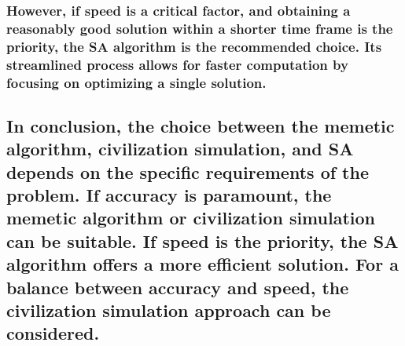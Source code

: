 \documentclass[11pt]{article}
\begin{document}
\hypertarget{however-if-speed-is-a-critical-factor-and-obtaining-a-reasonably-good-solution-within-a-shorter-time-frame-is-the-priority-the-sa-algorithm-is-the-recommended-choice.-its-streamlined-process-allows-for-faster-computation-by-focusing-on-optimizing-a-single-solution.}{%
\subsubsection{\texorpdfstring{ However, if speed is a critical factor,
and obtaining a reasonably good solution within a shorter time frame is
the priority, the SA algorithm is the recommended choice. Its
streamlined process allows for faster computation by focusing on
optimizing a single
solution.}{ However, if speed is a critical factor, and obtaining a reasonably good solution within a shorter time frame is the priority, the SA algorithm is the recommended choice. Its streamlined process allows for faster computation by focusing on optimizing a single solution.}}\label{however-if-speed-is-a-critical-factor-and-obtaining-a-reasonably-good-solution-within-a-shorter-time-frame-is-the-priority-the-sa-algorithm-is-the-recommended-choice.-its-streamlined-process-allows-for-faster-computation-by-focusing-on-optimizing-a-single-solution.}}

\hypertarget{in-conclusion-the-choice-between-the-memetic-algorithm-civilization-simulation-and-sa-depends-on-the-specific-requirements-of-the-problem.-if-accuracy-is-paramount-the-memetic-algorithm-or-civilization-simulation-can-be-suitable.-if-speed-is-the-priority-the-sa-algorithm-offers-a-more-efficient-solution.-for-a-balance-between-accuracy-and-speed-the-civilization-simulation-approach-can-be-considered.}{%
\subsection{\texorpdfstring{ In conclusion, the choice between the
memetic algorithm, civilization simulation, and SA depends on the
specific requirements of the problem. If accuracy is paramount, the
memetic algorithm or civilization simulation can be suitable. If speed
is the priority, the SA algorithm offers a more efficient solution. For
a balance between accuracy and speed, the civilization simulation
approach can be
considered.}{ In conclusion, the choice between the memetic algorithm, civilization simulation, and SA depends on the specific requirements of the problem. If accuracy is paramount, the memetic algorithm or civilization simulation can be suitable. If speed is the priority, the SA algorithm offers a more efficient solution. For a balance between accuracy and speed, the civilization simulation approach can be considered.}}\label{in-conclusion-the-choice-between-the-memetic-algorithm-civilization-simulation-and-sa-depends-on-the-specific-requirements-of-the-problem.-if-accuracy-is-paramount-the-memetic-algorithm-or-civilization-simulation-can-be-suitable.-if-speed-is-the-priority-the-sa-algorithm-offers-a-more-efficient-solution.-for-a-balance-between-accuracy-and-speed-the-civilization-simulation-approach-can-be-considered.}}


    
    
    
\end{document}
